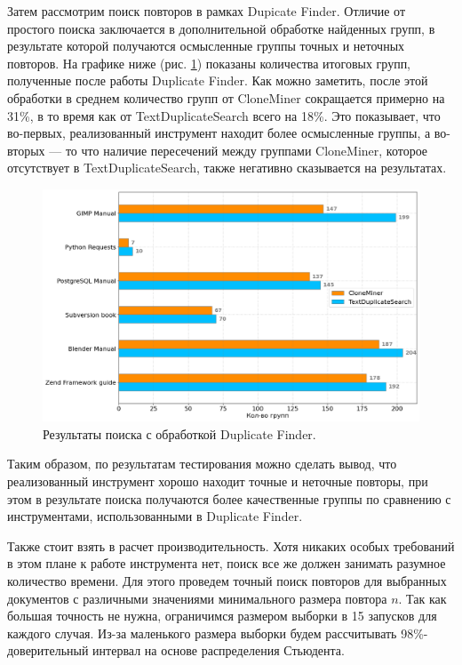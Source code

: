 \documentclass[14pt]{matmex-diploma-custom}
\begin{document}
Затем рассмотрим поиск повторов в рамках Dupicate Finder. Отличие от простого поиска заключается в дополнительной обработке найденных групп, в результате которой получаются осмысленные группы точных и неточных повторов. На графике ниже (рис. \ref{fig:Comp2}) показаны количества итоговых групп, полученные после работы Duplicate Finder. Как можно заметить, после этой обработки в среднем количество групп от CloneMiner сокращается примерно на 31\%, в то время как от TextDuplicateSearch всего на 18\%. Это показывает, что во-первых, реализованный инструмент находит более осмысленные группы, а во-вторых --- то что наличие пересечений между группами CloneMiner, которое отсутствует в TextDuplicateSearch, также негативно сказывается на результатах.

\begin{figure}[h!]
	\centering
	\includegraphics[scale=0.47]{pictures/Comp2.png}
	\caption{Результаты поиска с обработкой Duplicate Finder.}
	\label{fig:Comp2}
\end{figure}

\newpage
Таким образом, по результатам тестирования можно сделать вывод, что реализованный инструмент хорошо находит точные и неточные повторы, при этом в результате поиска получаются более качественные группы по сравнению с инструментами, использованными в Duplicate Finder.

Также стоит взять в расчет производительность. Хотя никаких особых требований в этом плане к работе инструмента нет, поиск все же должен занимать разумное количество времени. Для этого проведем точный поиск повторов для выбранных документов с различными значениями минимального размера повтора $n$. Так как большая точность не нужна, ограничимся размером выборки в 15 запусков для каждого случая. Из-за маленького размера выборки будем рассчитывать 98\%-доверительный интервал на основе распределения Стьюдента.
\end{document}
